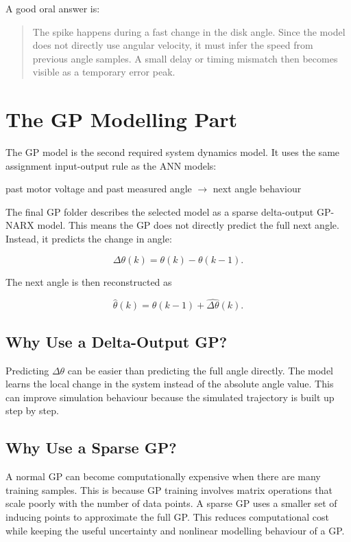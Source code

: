\documentclass[11pt,a4paper]{article}
\begin{document}
A good oral answer is:

\begin{quote}
The spike happens during a fast change in the disk angle. Since the model does not directly use angular velocity, it must infer the speed from previous angle samples. A small delay or timing mismatch then becomes visible as a temporary error peak.
\end{quote}

\section{The GP Modelling Part}

The GP model is the second required system dynamics model.
It uses the same assignment input-output rule as the ANN models:

\begin{center}
past motor voltage and past measured angle $\rightarrow$ next angle behaviour
\end{center}

The final GP folder describes the selected model as a sparse delta-output GP-NARX model.
This means the GP does not directly predict the full next angle.
Instead, it predicts the change in angle:

\begin{equation}
\Delta \theta(k) = \theta(k) - \theta(k-1).
\end{equation}

The next angle is then reconstructed as

\begin{equation}
\hat{\theta}(k) = \theta(k-1) + \widehat{\Delta \theta}(k).
\end{equation}

\subsection{Why Use a Delta-Output GP?}

Predicting $\Delta \theta$ can be easier than predicting the full angle directly.
The model learns the local change in the system instead of the absolute angle value.
This can improve simulation behaviour because the simulated trajectory is built up step by step.

\subsection{Why Use a Sparse GP?}

A normal GP can become computationally expensive when there are many training samples.
This is because GP training involves matrix operations that scale poorly with the number of data points.
A sparse GP uses a smaller set of inducing points to approximate the full GP.
This reduces computational cost while keeping the useful uncertainty and nonlinear modelling behaviour of a GP.
\end{document}
